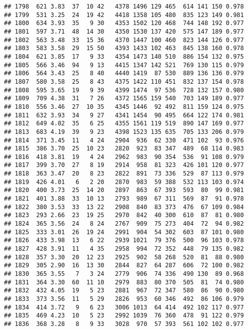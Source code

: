 \documentclass[]{article}
\begin{document}
\begin{verbatim}
## 1798  621 3.83  37  10 42   4378 1496 129 465  614 141 150 0.978
## 1799  531 3.25  24  19 42   4418 1358 105 480  835 123 149 0.981
## 1800  634 3.93  35   9 30   4353 1502 120 468  744 148 192 0.977
## 1801  597 3.71  48  14 30   4350 1530 137 420  575 147 189 0.977
## 1802  563 3.48  33  15 36   4370 1447 100 460  823 144 126 0.977
## 1803  583 3.58  29  15 50   4393 1433 102 463  845 138 160 0.978
## 1804  621 3.85  17   9 33   4354 1473 140 510  886 154 132 0.975
## 1805  566 3.46  94   9 13   4415 1347 142 521  769 130 115 0.979
## 1806  564 3.43  25   8 40   4440 1419  87 530  889 136 136 0.979
## 1807  580 3.58  25   8 43   4375 1422 110 451  832 137 154 0.978
## 1808  595 3.65  19   9 39   4399 1474  97 536  728 132 157 0.980
## 1809  709 4.38  31   7 26   4372 1565 159 540  703 149 189 0.977
## 1810  556 3.46  27  10 35   4345 1446  92 492  811 159 124 0.975
## 1811  632 3.93  34   9 27   4341 1454  90 495  664 122 174 0.981
## 1812  649 4.02  35   6 25   4355 1561 119 519  890 147 169 0.977
## 1813  683 4.19  39   9 23   4398 1523 135 635  705 133 206 0.979
## 1814  371 3.45  11   4 24   2904  936  62 330  471 102  93 0.976
## 1815  386 3.70  25  10 23   2820  923  83 347  489  68 114 0.983
## 1816  418 3.81  19   4 24   2962  983  90 354  536  91 108 0.979
## 1817  399 3.70  27   8 19   2914  958  81 323  426 101 120 0.977
## 1818  363 3.47  20   8 23   2822  891  73 336  529  87 113 0.979
## 1819  426 4.01   6   2 20   2870  983  59 388  532 113 103 0.974
## 1820  400 3.73  25  14 20   2897  863  67 393  593  80  99 0.981
## 1821  401 3.88  33  10 13   2793  989  67 311  569  87  91 0.978
## 1822  380 3.53  33  13 22   2908  840  83 373  476  67 109 0.984
## 1823  293 2.66  23  19 25   2970  842  40 300  610  87  81 0.980
## 1824  365 3.56  24   8 24   2767  909  75 273  404  72  94 0.982
## 1825  333 3.01  26  19 24   2991  904  54 302  603  87 101 0.980
## 1826  433 3.98  13   6 22   2939 1021  79 376  500  96 103 0.978
## 1827  428 3.91  11   4 35   2958  994  72 352  448  79 135 0.982
## 1828  357 3.30  20  12 23   2925  902  58 268  520  81  88 0.980
## 1829  305 2.90  16  13 30   2844  827  64 287  606  72 100 0.982
## 1830  365 3.55   7   3 24   2779  906  74 336  490 130  89 0.968
## 1831  364 3.30  60  11 10   2979  883  80 370  505  81  74 0.980
## 1832  432 4.05  19   5 23   2881  967  72 347  580  86  90 0.980
## 1833  373 3.56  11   5 29   2826  953  60 346  492  86 106 0.979
## 1834  414 3.72   9   6 23   3006 1013  64 414  492 102 117 0.977
## 1835  469 4.23  10   5 23   2992 1039  76 360  478  91 122 0.979
## 1836  368 3.28   8   9 33   3028  970  57 393  561 102 102 0.977

\end{verbatim}
\end{document}
